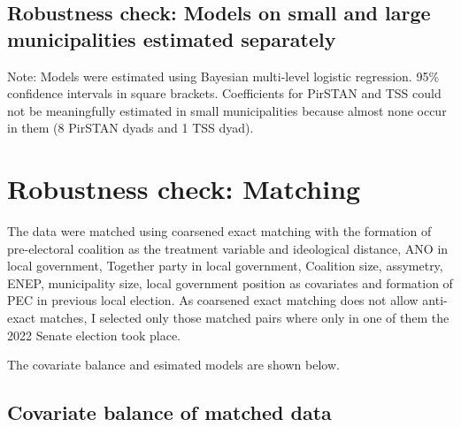 \documentclass[]{interact}
\theoremstyle{plain}%
\theoremstyle{definition}
\theoremstyle{remark}
\begin{document}
\begin{landscape}

\section{Robustness check: Models on small and large municipalities estimated separately}
\label{app:2b}
\begin{table}[!h]
\centering
\begin{adjustbox}{max width=9in}

\end{adjustbox}
\begin{minipage}{9in}
\footnotesize{Note: Models were estimated using Bayesian multi-level logistic regression. 95\% confidence intervals in square brackets. Coefficients for PirSTAN and TSS could not be meaningfully estimated in small municipalities because almost none occur in them (8 PirSTAN dyads and 1 TSS dyad).}
\end{minipage}

\end{table}

\end{landscape}

\newpage
\section{Robustness check: Matching}
\label{app:3}

The data were matched using coarsened exact matching with the formation of pre-electoral coalition as the treatment variable and ideological distance, ANO in local government, Together party in local government, Coalition size, assymetry, ENEP, municipality size, local government position as covariates and formation of PEC in previous local election. 
As coarsened exact matching does not allow anti-exact matches, I selected only those matched pairs where only in one of them the 2022 Senate election took place.

The covariate balance and esimated models are shown below.

\subsection{Covariate balance of matched data \label{tab:4}}
\end{document}
